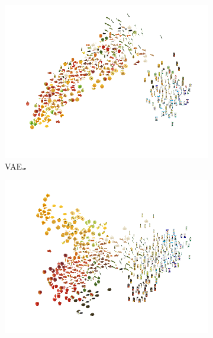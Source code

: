 \vspace{-3mm}
\begin{figure}
	\centering
	\vspace{-5mm}
	\begin{subfigure}[b]{0.26\textwidth}
		\centering
		\includegraphics[width=\textwidth]{Chapter1/pics_paperB/pca_latents_vae_seed2}
		\vspace{-7mm}
		\caption{VAE$_{{\bm{x}}}$}
		\label{fig:pca_latents_vae}
	\end{subfigure} 
	\hspace{-5mm}
	\begin{subfigure}[b]{0.26\textwidth}
		\centering
		\includegraphics[width=\textwidth]{Chapter1/pics_paperB/pca_latents_vcca_xiwy_seed2}

\end{subfigure}
\end{figure}
